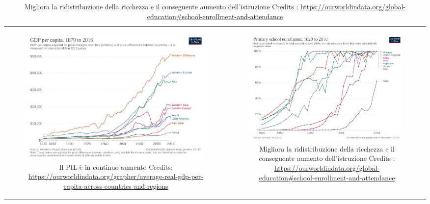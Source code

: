 \documentclass[12pt]{book} %
\begin{document}
\begin{table}[H]
\centering
\begin{tabular}{cc}
  \begin{subfigure}{0.5\textwidth}
    \centering
    \includegraphics[width=0.8\linewidth]{images/Libro-img008.png}
    \caption{Il PIL è in continuo aumento
Credits: \protect\url{https://ourworldindata.org/grapher/average-real-gdp-per-capita-across-countries-and-regions}}
  \end{subfigure}
  &
  \begin{subfigure}{0.5\textwidth}
    \centering
    \includegraphics[width=0.8\linewidth]{images/Libro-img009.png}
    \caption{Migliora la ridistribuzione della ricchezza e il conseguente aumento dell'istruzione
Credits : \protect\url{https://ourworldindata.org/global-education\#school-enrollment-and-attendance}}
  \end{subfigure}
\end{tabular}
\end{table}
\end{document}

